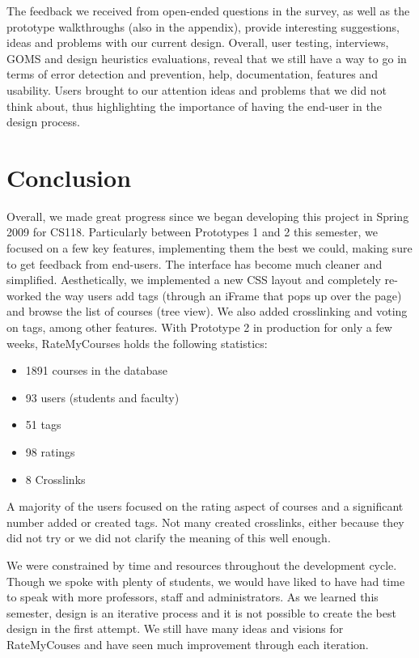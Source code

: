 \documentclass[12pt]{report}
\begin{document}
The feedback we received from open-ended questions in the survey, as well as the prototype walkthroughs (also in the appendix), provide interesting suggestions, ideas and problems with our current design. Overall, user testing, interviews, GOMS and design heuristics evaluations, reveal that we still have a way to go in terms of error detection and prevention, help, documentation, features and usability. Users brought to our attention ideas and problems that we did not think about, thus highlighting the importance of having the end-user in the design process.


\section{Conclusion}

Overall, we made great progress since we began developing this project in Spring 2009 for CS118. Particularly between Prototypes 1 and 2 this semester, we focused on a few key features, implementing them the best we could, making sure to get feedback from end-users. The interface has become much cleaner and simplified. Aesthetically, we implemented a new CSS layout and completely re-worked the way users add tags (through an iFrame that pops up over the page) and browse the list of courses (tree view). We also added crosslinking and voting on tags, among other features. With Prototype 2 in production for only a few weeks, RateMyCourses holds the following statistics:

\begin{itemize}
\item 1891 courses in the database
\item 93 users (students and faculty)
\item 51 tags
\item 98 ratings
\item 8 Crosslinks
\end{itemize}

A majority of the users focused on the rating aspect of courses and a significant number added or created tags. Not many created crosslinks, either because they did not try or we did not clarify the meaning of this well enough.

We were constrained by time and resources throughout the development cycle. Though we spoke with plenty of students, we would have liked to have had time to speak with more professors, staff and administrators. As we learned this semester, design is an iterative process and it is not possible to create the best design in the first attempt. We still have many ideas and visions for RateMyCouses and have seen much improvement through each iteration.
\end{document}

